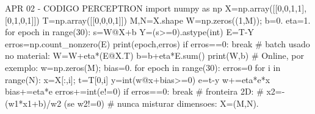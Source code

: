 APR 02 - CODIGO PERCEPTRON
import numpy as np
X=np.array([[0,0,1,1],[0,1,0,1]])
T=np.array([[0,0,0,1]])
M,N=X.shape
W=np.zeros((1,M)); b=0.
eta=1.
for epoch in range(30):
    s=W@X+b
    Y=(s>=0).astype(int)
    E=T-Y
    erros=np.count_nonzero(E)
    print(epoch,erros)
    if erros==0: break
    # batch usado no material:
    W=W+eta*(E@X.T)
    b=b+eta*E.sum()
print(W,b)
# Online, por exemplo:
w=np.zeros(M); bias=0.
for epoch in range(30):
    erros=0
    for i in range(N):
        x=X[:,i]; t=T[0,i]
        y=int(w@x+bias>=0)
        e=t-y
        w+=eta*e*x
        bias+=eta*e
        erros+=int(e!=0)
    if erros==0: break
# fronteira 2D:
# x2=-(w1*x1+b)/w2 (se w2!=0)
# nunca misturar dimensoes: X=(M,N).